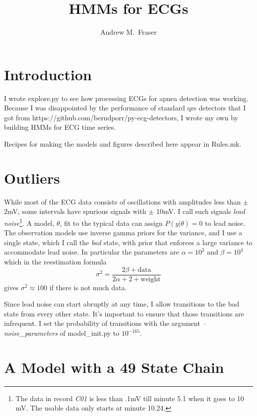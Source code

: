 \documentclass[12pt]{article}
\title{HMMs for ECGs}
\author{Andrew M.\ Fraser}
\begin{document}
\maketitle

\section{Introduction}
\label{sec:introduction}

I wrote explore.py to see how processing ECGs for apnea detection was
working.  Because I was disappointed by the performance of standard qrs
detectors that I got from
https://github.com/berndporr/py-ecg-detectors, I wrote my own by
building HMMs for ECG time series.

Recipes for making the models and figures described here appear in
Rules.mk.

\section{Outliers}
\label{sec:outliers}

While most of the ECG data consists of oscillations with amplitudes
less than $\pm$ 2mV, some intervals have spurious signals with $\pm$
10mV.  I call such signals \emph{lead noise}\footnote{The data in
  record \emph{C01} is less than .1mV till minute 5.1 when it goes to
  10 mV.  The usable data only starts at minute 10.24.}.  A model,
$\theta$, fit to the typical data can assign $P(y|\theta) = 0$ to lead
noise.  The observation models use inverse gamma priors for the
variance, and I use a single state, which I call the \emph{bad} state,
with prior that enforces a large variance to accommodate lead noise.
In particular the parameters are $\alpha=10^{2}$ and $\beta=10^{4}$
which in the reestimation formula
\begin{equation*}
  \sigma^2 = \frac{2 \beta + \text{data}}{2 \alpha +2 + \text{weight}}
\end{equation*}
gives $\sigma^2 \approx 100$ if there is not much data.

Since lead noise can start abruptly at any time, I allow transitions
to the bad state from every other state.  It's important to ensure
that those transitions are infrequent.  I set the probability of
transitions with the argument \emph{--noise\_parameters} of
model\_init.py to $10^{-165}$.

\section{A Model with a 49 State Chain}
\label{sec:mono20}
\end{document}
